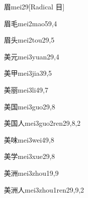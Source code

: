 \begin{verbete}{眉}{mei2}{9}[Radical 目]
\end{verbete}

\begin{verbete}{眉毛}{mei2mao5}{9,4}
\end{verbete}

\begin{verbete}{眉头}{mei2tou2}{9,5}
\end{verbete}

\begin{verbete}{美元}{mei3yuan2}{9,4}
\end{verbete}

\begin{verbete}{美甲}{mei3jia3}{9,5}
\end{verbete}

\begin{verbete}{美丽}{mei3li4}{9,7}
\end{verbete}

\begin{verbete}{美国}{mei3guo2}{9,8}
\end{verbete}

\begin{verbete}{美国人}{mei3guo2ren2}{9,8,2}
\end{verbete}

\begin{verbete}{美味}{mei3wei4}{9,8}
\end{verbete}

\begin{verbete}{美学}{mei3xue2}{9,8}
\end{verbete}

\begin{verbete}{美洲}{mei3zhou1}{9,9}
\end{verbete}

\begin{verbete}{美洲人}{mei3zhou1ren2}{9,9,2}
\end{verbete}

